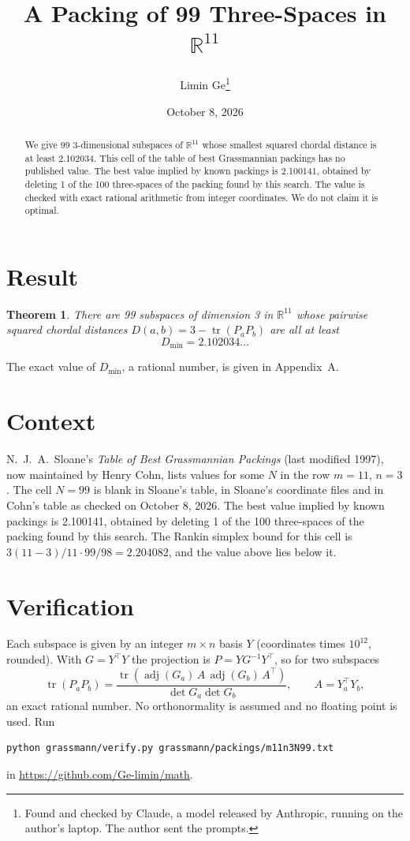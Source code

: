 \documentclass[11pt,a4paper]{article}
\title{A Packing of 99 Three-Spaces in $\mathbb{R}^{11}$}
\author{Limin Ge\thanks{Found and checked by Claude, a model released by Anthropic, running on the author's laptop. The author sent the prompts.}}
\date{October 8, 2026}
\newtheorem*{theorem}{Theorem}
\begin{document}
\maketitle
\begin{abstract}
We give 99 3-dimensional subspaces of $\mathbb{R}^{11}$ whose smallest squared chordal distance is at least 2.102034. This cell of the table of best Grassmannian packings has no published value. The best value implied by known packings is 2.100141, obtained by deleting 1 of the 100 three-spaces of the packing found by this search. The value is checked with exact rational arithmetic from integer coordinates. We do not claim it is optimal.
\end{abstract}

\section{Result}
\begin{theorem}
There are 99 subspaces of dimension 3 in $\mathbb{R}^{11}$ whose pairwise squared chordal distances $D(a,b) = 3 - \operatorname{tr}(P_aP_b)$ are all at least
\[ D_{\min} = 2.102034\ldots \]
\end{theorem}
The exact value of $D_{\min}$, a rational number, is given in Appendix~A.


\section{Context}
N.~J.~A.~Sloane's \emph{Table of Best Grassmannian Packings} (last modified 1997), now maintained by Henry Cohn, lists values for some $N$ in the row $m=11$, $n=3$. The cell $N=99$ is blank in Sloane's table, in Sloane's coordinate files and in Cohn's table as checked on October 8, 2026. The best value implied by known packings is 2.100141, obtained by deleting 1 of the 100 three-spaces of the packing found by this search. The Rankin simplex bound for this cell is $3(11-3)/11\cdot 99/98 = 2.204082$, and the value above lies below it.


\section{Verification}
Each subspace is given by an integer $m\times n$ basis $Y$ (coordinates times $10^{12}$, rounded). With $G=Y^\top Y$ the projection is $P=YG^{-1}Y^\top$, so for two subspaces
\[ \operatorname{tr}(P_aP_b)=\frac{\operatorname{tr}(\operatorname{adj}(G_a)\,A\,\operatorname{adj}(G_b)\,A^\top)}{\det G_a\det G_b},\qquad A=Y_a^\top Y_b, \]
an exact rational number. No orthonormality is assumed and no floating point is used. Run
\begin{verbatim}
python grassmann/verify.py grassmann/packings/m11n3N99.txt
\end{verbatim}
in \url{https://github.com/Ge-limin/math}.
\end{document}
